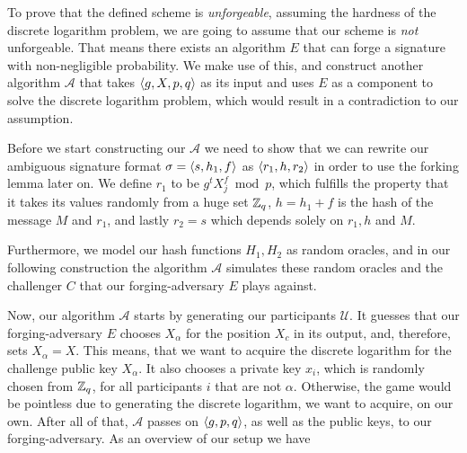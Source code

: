 To prove that the defined scheme is \textit{unforgeable}, assuming the hardness of the discrete logarithm problem, we are going to assume that our scheme is \textit{not} unforgeable.
That means there exists an algorithm \(E\) that can forge a signature with non-negligible probability.
We make use of this, and construct another algorithm \(\mathcal{A}\) that takes \(\langle g,X,p,q \rangle\) as its input and uses \(E\) as a component to solve the discrete logarithm problem, which would result in a contradiction to our assumption.

Before we start constructing our \(\mathcal{A}\) we need to show that we can rewrite our ambiguous signature format \(\sigma = \langle s,h_1, f \rangle\) as \(\langle r_1, h, r_2 \rangle\) in order to use the forking lemma later on.
We define \(r_1\) to be \(g^t X_j^f \bmod p\), which fulfills the property that it takes its values randomly from a huge set \(\mathbb{Z}_q\), \(h = h_1 + f\) is the hash of the message \(M\) and \(r_1\), and lastly \(r_2 = s\) which depends solely on \(r_1, h\) and \(M\).

Furthermore, we model our hash functions \(H_1, H_2\) as random oracles, and in our following construction the algorithm \(\mathcal{A}\) simulates these random oracles and the challenger \(C\) that our forging-adversary \(E\) plays against.

Now, our algorithm \(\mathcal{A}\) starts by generating our participants \(\mathcal{U}\). It guesses that our forging-adversary \(E\) chooses \(X_\alpha\) for the position \(X_c\) in its output, and, therefore, sets \(X_\alpha = X\).
This means, that we want to acquire the discrete logarithm for the challenge public key \(X_\alpha\).
It also chooses a private key \(x_i\), which is randomly chosen from \(\mathbb{Z}_q\), for all participants \(i\) that are not \(\alpha\).
Otherwise, the game would be pointless due to generating the discrete logarithm, we want to acquire, on our own.
After all of that, \(\mathcal{A}\) passes on \(\langle g,p,q \rangle\), as well as the public keys, to our forging-adversary.
As an overview of our setup we have 

